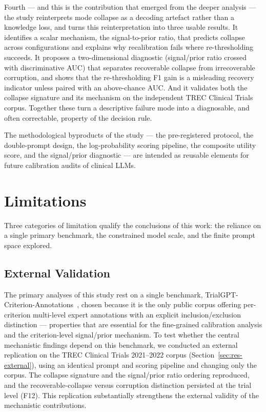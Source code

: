 Fourth --- and this is the contribution that emerged from the deeper 
analysis --- the study reinterprets mode collapse as a decoding 
artefact rather than a knowledge loss, and turns this reinterpretation 
into three usable results. It identifies a scalar mechanism, the 
signal-to-prior ratio, that predicts collapse across configurations and 
explains why recalibration fails where re-thresholding succeeds. It 
proposes a two-dimensional diagnostic (signal/prior ratio crossed with 
discriminative AUC) that separates recoverable collapse from 
irrecoverable corruption, and shows that the re-thresholding F1 gain is 
a misleading recovery indicator unless paired with an above-chance AUC. 
And it validates both the collapse signature and its mechanism on the 
independent TREC Clinical Trials corpus. Together these turn a 
descriptive failure mode into a diagnosable, and often correctable, 
property of the decision rule.

The methodological byproducts of the study --- the pre-registered 
protocol, the double-prompt design, the log-probability scoring 
pipeline, the composite utility score, and the signal/prior diagnostic 
--- are intended as reusable elements for future calibration audits of 
clinical LLMs.

\section{Limitations}
\label{sec:conc-limitations}

Three categories of limitation qualify the conclusions of this work: 
the reliance on a single primary benchmark, the constrained model 
scale, and the finite prompt space explored.

\subsection{External Validation}
\label{subsec:conc-limitations-external}

The primary analyses of this study rest on a single benchmark, 
TrialGPT-Criterion-Annotations~\cite{jin2024trialgpt}, chosen because 
it is the only public corpus offering per-criterion multi-level expert 
annotations with an explicit inclusion/exclusion distinction --- 
properties that are essential for the fine-grained calibration analysis 
and the criterion-level signal/prior mechanism. To test whether the 
central mechanistic findings depend on this benchmark, we conducted an 
external replication on the TREC Clinical Trials 2021--2022 corpus 
(Section~\ref{sec:res-external}), using an identical prompt and scoring 
pipeline and changing only the corpus. The collapse signature and the 
signal/prior ratio ordering reproduced, and the recoverable-collapse 
versus corruption distinction persisted at the trial level (F12). This 
replication substantially strengthens the external validity of the 
mechanistic contributions.

